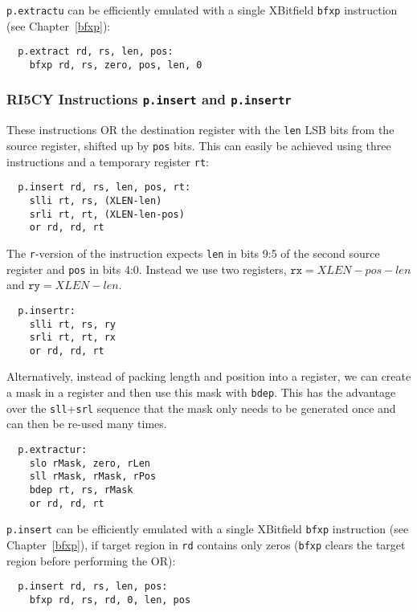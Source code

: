 {\tt p.extractu} can be efficiently emulated with a single XBitfield {\tt bfxp}
instruction (see Chapter~\ref{bfxp}):

\begin{verbatim}
  p.extract rd, rs, len, pos:
    bfxp rd, rs, zero, pos, len, 0
\end{verbatim}

\subsubsection{RI5CY Instructions {\tt p.insert} and {\tt p.insertr}}

These instructions OR the destination register with the {\tt len} LSB bits
from the source register, shifted up by {\tt pos} bits. This can easily
be achieved using three instructions and a temporary register {\tt rt}:

\begin{verbatim}
  p.insert rd, rs, len, pos, rt:
    slli rt, rs, (XLEN-len)
    srli rt, rt, (XLEN-len-pos)
    or rd, rd, rt
\end{verbatim}

The {\tt r}-version of the instruction expects {\tt len} in bits 9:5 of the
second source register and {\tt pos} in bits 4:0. Instead we use two registers,
$\texttt{rx} = XLEN-pos-len$ and $\texttt{ry} = XLEN-len$.

\begin{verbatim}
  p.insertr:
    slli rt, rs, ry
    srli rt, rt, rx
    or rd, rd, rt
\end{verbatim}

Alternatively, instead of packing length and position into a register, we
can create a mask in a register and then use this mask with {\tt bdep}. This
has the advantage over the {\tt sll}+{\tt srl} sequence that the mask only needs
to be generated once and can then be re-used many times.

\begin{verbatim}
  p.extractur:
    slo rMask, zero, rLen
    sll rMask, rMask, rPos
    bdep rt, rs, rMask
    or rd, rd, rt
\end{verbatim}

{\tt p.insert} can be efficiently emulated with a single XBitfield {\tt bfxp}
instruction (see Chapter~\ref{bfxp}), if target region in {\tt rd} contains
only zeros ({\tt bfxp} clears the target region before performing the OR):

\begin{verbatim}
  p.insert rd, rs, len, pos:
    bfxp rd, rs, rd, 0, len, pos
\end{verbatim}

